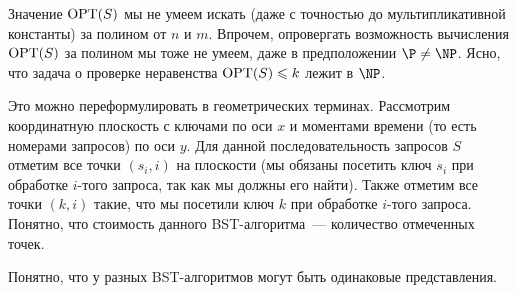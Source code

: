 Значение
$\operatorname{OPT}(S)$ мы не умеем искать (даже с точностью до мультипликативной
константы) за полином от $n$ и $m$. 
Впрочем, опровергать возможность вычисления $\operatorname{OPT}(S)$
за полином мы тоже не умеем, даже в предположении $\P \neq \NP$. Ясно,
что задача о проверке неравенства $\operatorname{OPT}(S) \leqslant k$ лежит в $\NP$.

Это можно переформулировать в геометрических терминах. Рассмотрим координатную
плоскость с ключами по оси $x$ и моментами времени (то есть номерами запросов) по
оси $y$. Для данной последовательность запросов $S$ отметим все точки $(s_i, i)$
на плоскости (мы обязаны посетить ключ $s_i$ при обработке $i$-того
запроса, так как мы должны его найти). Также отметим все точки $(k, i)$ такие,
что мы посетили ключ $k$ при обработке $i$-того запроса. Понятно, что стоимость данного BST-алгоритма~--- количество отмеченных точек.


\begin{remark}
Понятно, что у разных BST-алгоритмов могут быть одинаковые представления.
\end{remark}


